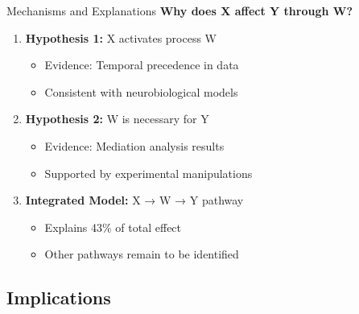 \documentclass[aspectratio=169,11pt]{beamer}
\begin{document}
\begin{frame}{Mechanisms and Explanations}
  \textbf{Why does X affect Y through W?}

  \vspace{0.3cm}

  \begin{enumerate}
    \item<1-> \textbf{Hypothesis 1:} X activates process W
    \begin{itemize}
      \item<1-> Evidence: Temporal precedence in data
      \item<1-> Consistent with neurobiological models
    \end{itemize}

    \vspace{0.3cm}

    \item<2-> \textbf{Hypothesis 2:} W is necessary for Y
    \begin{itemize}
      \item<2-> Evidence: Mediation analysis results
      \item<2-> Supported by experimental manipulations
    \end{itemize}

    \vspace{0.3cm}

    \item<3-> \textbf{Integrated Model:} X → W → Y pathway
    \begin{itemize}
      \item<3-> Explains 43\% of total effect
      \item<3-> Other pathways remain to be identified
    \end{itemize}
  \end{enumerate}
\end{frame}

\subsection{Implications}
\end{document}
